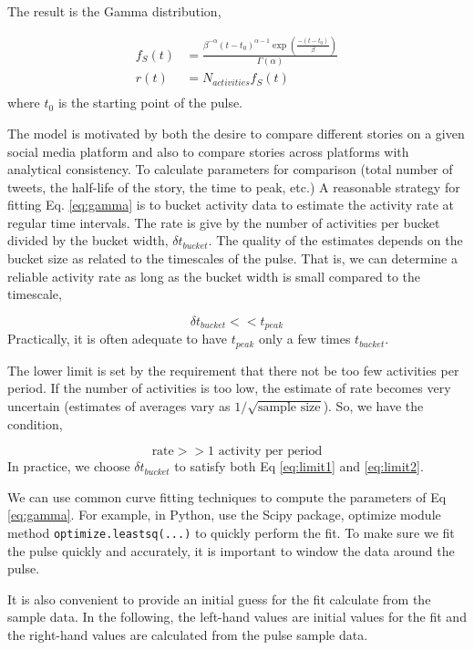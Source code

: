 \documentclass{article}
\begin{document}
The result is the Gamma distribution,

\begin{eqnarray}
f_S(t) & = \frac{ \beta^{-\alpha} (t-t_0)^{\alpha-1} \exp( \frac{-(t-t_0)}{\beta}) } {\Gamma(\alpha)} \\
r(t) & = N_{activities} f_S(t) \\
\label{eq:gamma}
\end{eqnarray}
where $t_0$ is the starting point of the pulse.

The model is motivated by both the desire to compare different stories on a given social media platform and also to compare stories across platforms with analytical consistency.  To calculate parameters for comparison (total number of tweets, the half-life of the story, the time to peak, etc.) A reasonable strategy for fitting Eq. \ref{eq:gamma} is to bucket activity data to estimate the activity rate at regular time intervals.  The rate is give by the number of activities per bucket divided by the bucket width, $\delta t_{bucket}$.  The quality of the estimates depends on the bucket size as related to the timescales of the pulse. That is, we can determine a reliable activity rate as long as the bucket width is small compared to the timescale,

\begin{equation} 
\delta t_{bucket} << t_{peak}
\label{eq:limit1}
\end{equation}
Practically, it is often adequate to have $t_{peak}$ only a few times $t_{bucket}$.

The lower limit is set by the requirement that there not be too few activities per period. If the number of activities is too low, the estimate of rate becomes very uncertain (estimates of averages vary as $1/\sqrt{\text{sample size}}$). So, we have the condition, 

\begin{equation} 
\text {rate} >> 1 \text { activity per period}
\label{eq:limit2}
\end{equation}
In practice, we choose $\delta t_{bucket}$ to satisfy both Eq \ref{eq:limit1} and \ref{eq:limit2}.

We can use common curve fitting techniques to compute the parameters of Eq \ref{eq:gamma}. For example, in Python, use the Scipy package,  optimize module method \texttt{optimize.leastsq(...)} to quickly perform the fit. To make sure we fit the pulse quickly and accurately, it is important to window the data around the pulse.

It is also convenient to provide an initial guess for the fit calculate from the sample data.  In the following, the left-hand values are initial values for the fit and the right-hand values are calculated from the pulse sample data.
\end{document}
